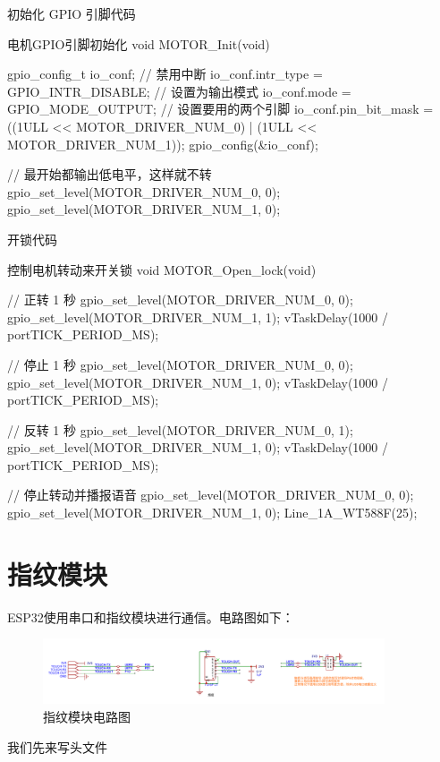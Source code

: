 \documentclass[lang=cn,newtx,10pt,scheme=chinese]{elegantbook}
\begin{document}
初始化 GPIO 引脚代码

\begin{mycode}{电机GPIO引脚初始化}
void MOTOR_Init(void)
{
    gpio_config_t io_conf;
    // 禁用中断
    io_conf.intr_type = GPIO_INTR_DISABLE;
    // 设置为输出模式
    io_conf.mode = GPIO_MODE_OUTPUT;
    // 设置要用的两个引脚
    io_conf.pin_bit_mask = ((1ULL << MOTOR_DRIVER_NUM_0) | (1ULL << MOTOR_DRIVER_NUM_1));
    gpio_config(&io_conf);

    // 最开始都输出低电平，这样就不转
    gpio_set_level(MOTOR_DRIVER_NUM_0, 0);
    gpio_set_level(MOTOR_DRIVER_NUM_1, 0);
}
\end{mycode}

开锁代码

\begin{mycode}{控制电机转动来开关锁}
void MOTOR_Open_lock(void)
{
    // 正转 1 秒
    gpio_set_level(MOTOR_DRIVER_NUM_0, 0);
    gpio_set_level(MOTOR_DRIVER_NUM_1, 1);
    vTaskDelay(1000 / portTICK_PERIOD_MS);

    // 停止 1 秒
    gpio_set_level(MOTOR_DRIVER_NUM_0, 0);
    gpio_set_level(MOTOR_DRIVER_NUM_1, 0);
    vTaskDelay(1000 / portTICK_PERIOD_MS);

    // 反转 1 秒
    gpio_set_level(MOTOR_DRIVER_NUM_0, 1);
    gpio_set_level(MOTOR_DRIVER_NUM_1, 0);
    vTaskDelay(1000 / portTICK_PERIOD_MS);

    // 停止转动并播报语音
    gpio_set_level(MOTOR_DRIVER_NUM_0, 0);
    gpio_set_level(MOTOR_DRIVER_NUM_1, 0);
    Line_1A_WT588F(25);
}
\end{mycode}

\chapter{指纹模块}

ESP32使用串口和指纹模块进行通信。电路图如下：

\begin{figure}[!htb]
\centering
\includegraphics[width=0.9\textwidth]{fingerprint.png}
\caption{指纹模块电路图}
\end{figure}

我们先来写头文件
\end{document}

